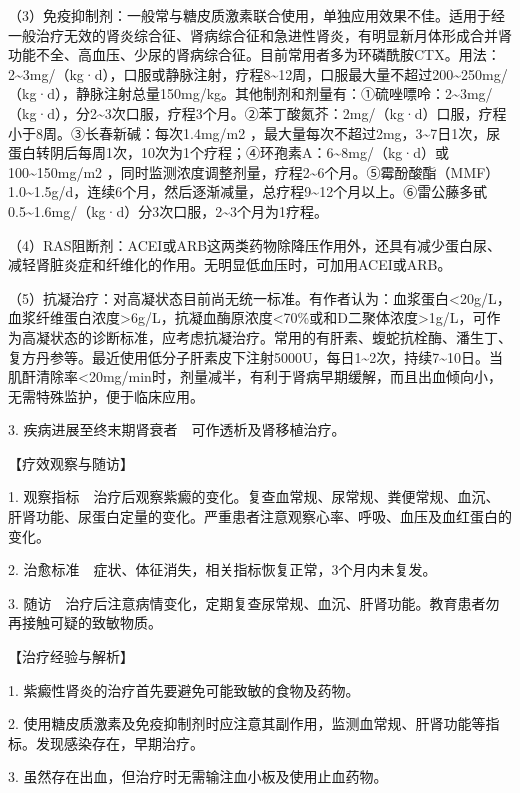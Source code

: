 （3）免疫抑制剂：一般常与糖皮质激素联合使用，单独应用效果不佳。适用于经一般治疗无效的肾炎综合征、肾病综合征和急进性肾炎，有明显新月体形成合并肾功能不全、高血压、少尿的肾病综合征。目前常用者多为环磷酰胺CTX。用法：2\textasciitilde{}3mg/（kg·d），口服或静脉注射，疗程8\textasciitilde{}12周，口服最大量不超过200\textasciitilde{}250mg/（kg·d），静脉注射总量150mg/kg。其他制剂和剂量有：①硫唑嘌呤：2\textasciitilde{}3mg/（kg·d），分2\textasciitilde{}3次口服，疗程3个月。②苯丁酸氮芥：2mg/（kg·d）口服，疗程小于8周。③长春新碱：每次1.4mg/m{2}
，最大量每次不超过2mg，3\textasciitilde{}7日1次，尿蛋白转阴后每周1次，10次为1个疗程；④环孢素A：6\textasciitilde{}8mg/（kg·d）或100\textasciitilde{}150mg/m{2}
，同时监测浓度调整剂量，疗程2\textasciitilde{}6个月。⑤霉酚酸酯（MMF）1.0\textasciitilde{}1.5g/d，连续6个月，然后逐渐减量，总疗程9\textasciitilde{}12个月以上。⑥雷公藤多甙0.5\textasciitilde{}1.6mg/（kg·d）分3次口服，2\textasciitilde{}3个月为1疗程。

（4）RAS阻断剂：ACEI或ARB这两类药物除降压作用外，还具有减少蛋白尿、减轻肾脏炎症和纤维化的作用。无明显低血压时，可加用ACEI或ARB。

（5）抗凝治疗：对高凝状态目前尚无统一标准。有作者认为：血浆蛋白\textless{}20g/L，血浆纤维蛋白浓度\textgreater{}6g/L，抗凝血酶原浓度\textless{}70\%或和D二聚体浓度\textgreater{}1g/L，可作为高凝状态的诊断标准，应考虑抗凝治疗。常用的有肝素、蝮蛇抗栓酶、潘生丁、复方丹参等。最近使用低分子肝素皮下注射5000U，每日1\textasciitilde{}2次，持续7\textasciitilde{}10日。当肌酐清除率\textless{}20mg/min时，剂量减半，有利于肾病早期缓解，而且出血倾向小，无需特殊监护，便于临床应用。

3. 疾病进展至终末期肾衰者　可作透析及肾移植治疗。

【疗效观察与随访】

1.
观察指标　治疗后观察紫癜的变化。复查血常规、尿常规、粪便常规、血沉、肝肾功能、尿蛋白定量的变化。严重患者注意观察心率、呼吸、血压及血红蛋白的变化。

2. 治愈标准　症状、体征消失，相关指标恢复正常，3个月内未复发。

3.
随访　治疗后注意病情变化，定期复查尿常规、血沉、肝肾功能。教育患者勿再接触可疑的致敏物质。

【治疗经验与解析】

1. 紫癜性肾炎的治疗首先要避免可能致敏的食物及药物。

2.
使用糖皮质激素及免疫抑制剂时应注意其副作用，监测血常规、肝肾功能等指标。发现感染存在，早期治疗。

3. 虽然存在出血，但治疗时无需输注血小板及使用止血药物。

